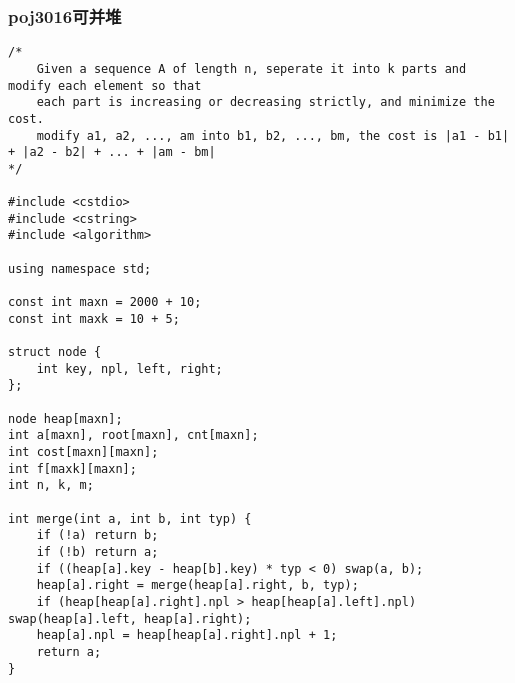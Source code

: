 \subsubsection{poj3016可并堆}
\begin{verbatim}
/*
	Given a sequence A of length n, seperate it into k parts and modify each element so that
	each part is increasing or decreasing strictly, and minimize the cost.
	modify a1, a2, ..., am into b1, b2, ..., bm, the cost is |a1 - b1| + |a2 - b2| + ... + |am - bm|
*/

#include <cstdio>
#include <cstring>
#include <algorithm>

using namespace std;

const int maxn = 2000 + 10;
const int maxk = 10 + 5;

struct node {
	int key, npl, left, right;
};

node heap[maxn];
int a[maxn], root[maxn], cnt[maxn];
int cost[maxn][maxn];
int f[maxk][maxn];
int n, k, m;

int merge(int a, int b, int typ) {
	if (!a) return b;
	if (!b) return a;
	if ((heap[a].key - heap[b].key) * typ < 0) swap(a, b);
	heap[a].right = merge(heap[a].right, b, typ);
	if (heap[heap[a].right].npl > heap[heap[a].left].npl) swap(heap[a].left, heap[a].right);
	heap[a].npl = heap[heap[a].right].npl + 1;
	return a;
}


\end{verbatim}
